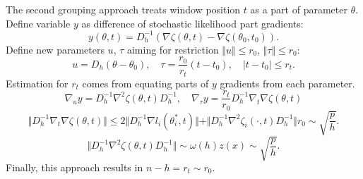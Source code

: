 The second grouping approach treats window position $t$ as a part of parameter $\theta$. Define variable $y$ as difference of stochastic likelihood part gradients: 
\[
y(\theta, t) = D_h^{-1} \left( \nabla \zeta(\theta,t) - \nabla \zeta(\theta_0,t_0) \right).
\]
Define new parameters $u$, $\tau$ aiming for restriction $\Vert u \Vert \leq r_0$, $\Vert \tau \Vert \leq r_0$:
\[
u = D_h (\theta - \theta_0), 
\quad
\tau = \frac{r_0}{r_t} (t - t_0),
\quad
|t- t_0| \leq r_t.
\]
Estimation for $r_t$ comes from equating parts of $y$ gradients from each parameter.
\[
\nabla_u y = D_h^{-1}  \nabla^2 \zeta(\theta,t) D_h^{-1},
\quad
\nabla_{\tau} y = \frac{r_t}{r_0} D_h^{-1} \nabla_t \nabla \zeta(\theta,t)
\]
\[
\Vert D_h^{-1} \nabla_t \nabla \zeta(\theta,t) \Vert \leq 2 \Vert D_h^{-1}  \nabla  l_i(\theta_i^*,t)  \Vert + \Vert D_h^{-1}  \nabla^2  \zeta_i(\cdot ,t) D_h^{-1} \Vert r_0 \sim \sqrt{\frac{p}{h}}.
\]
\[
\Vert D_h^{-1}  \nabla^2 \zeta(\theta,t) D_h^{-1} \Vert 	\sim  \omega(h) z(x) \sim \sqrt{\frac{p}{h}}.
\]
Finally, this approach results in $n - h = r_t \sim r_0$.


  